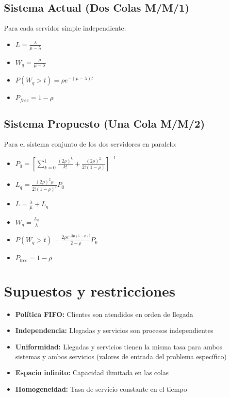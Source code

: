 \documentclass[letterpaper, 12pt]{report}
\begin{document}
\subsection{Sistema Actual (Dos Colas M/M/1)}

Para cada servidor simple independiente:
\begin{itemize}
    \item $L = \frac{\lambda}{\mu - \lambda}$
    \item $W_q = \frac{\rho}{\mu - \lambda}$
    \item $P(W_q > t) = \rho e^{-(\mu - \lambda)t}$
    \item $P_{free} = 1 - \rho$
\end{itemize}

\subsection{Sistema Propuesto (Una Cola M/M/2)}
Para el sistema conjunto de los dos servidores en paralelo:
\begin{itemize}
    \item 
    $P_0 = \left[\sum_{k=0}^{1}\frac{(2\rho)^k}{k!} + \frac{(2\rho)^2}{2!(1-\rho)}\right]^{-1}$
    
    \item $L_q = \frac{(2\rho)^2\rho}{2!(1-\rho)^2}P_0$
    
    \item $L = \frac{\lambda}{\mu} + L_q$
    
    \item $W_q = \frac{L_q}{\lambda}$
    
    \item $P(W_q > t) = \frac{2\rho e^{-2\mu(1-\rho)t}}{2 - \rho}P_0$
    
    \item $P_{\text{free}} = 1 - \rho$ \\
\end{itemize}


\section{Supuestos y restricciones}
\begin{itemize}
    \item \textbf{Política FIFO:} Clientes son atendidos en orden de llegada
    \item \textbf{Independencia:} Llegadas y servicios son procesos independientes
    \item \textbf{Uniformidad:} Llegadas y servicios tienen la misma tasa para ambos sistemas y ambos servicios (valores de entrada del problema específico)
    \item \textbf{Espacio infinito:} Capacidad ilimitada en las colas
    \item \textbf{Homogeneidad:} Tasa de servicio constante en el tiempo
\end{itemize}
\end{document}
